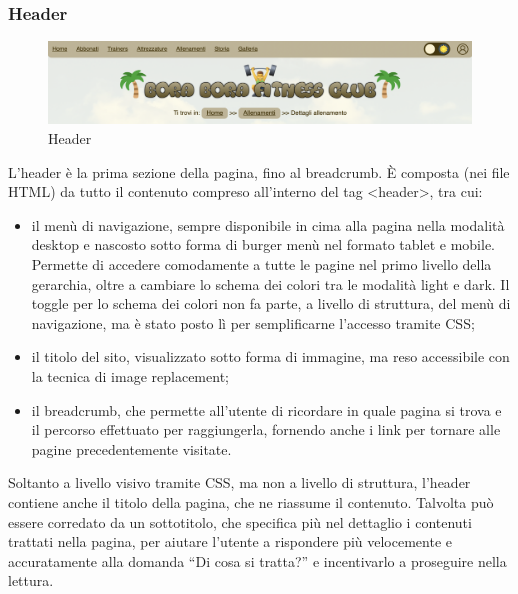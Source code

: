 \documentclass[a4paper]{article}
\begin{document}
	\subsubsection{Header} \label{header}
	\begin{figure}[H]
		\centering
		\includegraphics[scale=0.35]{immagini/header.png}
		\caption{Header}
	\end{figure}
	L'header è la prima sezione della pagina, fino al breadcrumb. È composta (nei file HTML) da tutto il contenuto compreso all'interno del tag <header>, tra cui:
	\begin{itemize}
		\item il menù di navigazione, sempre disponibile in cima alla pagina nella modalità desktop e nascosto sotto forma di burger menù nel formato tablet e mobile. Permette di accedere comodamente a tutte le pagine nel primo livello della gerarchia, oltre a cambiare lo schema dei colori tra le modalità light e dark. Il toggle per lo schema dei colori non fa parte, a livello di struttura, del menù di navigazione, ma è stato posto lì per semplificarne l'accesso tramite CSS;
		\item il titolo del sito, visualizzato sotto forma di immagine, ma reso accessibile con la tecnica di image replacement;
		\item il breadcrumb, che permette all'utente di ricordare in quale pagina si trova e il percorso effettuato per raggiungerla, fornendo anche i link per tornare alle pagine precedentemente visitate.
	\end{itemize}
	Soltanto a livello visivo tramite CSS, ma non a livello di struttura, l'header contiene anche il titolo della pagina, che ne riassume il contenuto. Talvolta può essere corredato da un sottotitolo, che specifica più nel dettaglio i contenuti trattati nella pagina, per aiutare l'utente a rispondere più velocemente e accuratamente alla domanda “Di cosa si tratta?” e incentivarlo a proseguire nella lettura.
	
\end{document}
